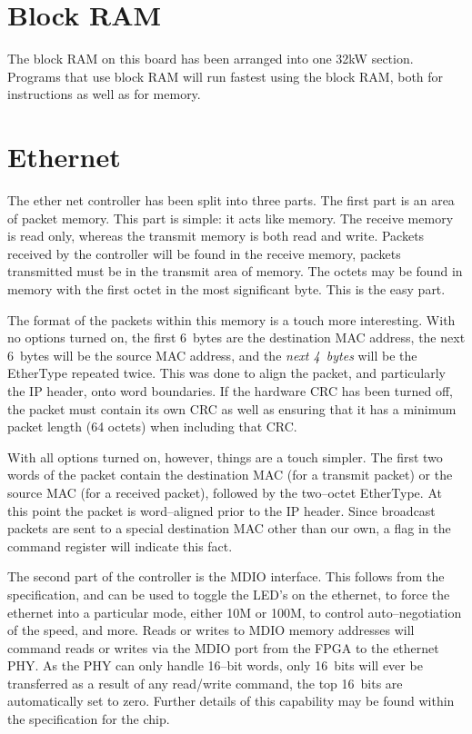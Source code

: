 \documentclass{gqtekspec}
\begin{document}
\section{Block RAM}

The block RAM on this board has been arranged into one 32kW section.
Programs that use block RAM will run fastest using the block RAM, both for
instructions as well as for memory.  

\section{Ethernet}

The ether net controller has been split into three parts.  The first part is
an area of packet memory.  This part is simple: it acts like memory.  The
receive memory is read only, whereas the transmit memory is both read and
write.  Packets received by the controller will be found in the receive memory,
packets transmitted must be in the transmit area of memory.  The octets
may be found in memory with the first octet in the most significant byte.
This is the easy part.

The format of the packets within this memory is a touch more interesting.
With no options turned on, the first 6~bytes are the destination MAC
address, the next 6~bytes will be the source MAC address, and the {\em next
4~bytes} will be the EtherType repeated twice.  This was done to align the
packet, and particularly the IP header, onto word boundaries.  If the hardware
CRC has been turned off, the packet must contain its own CRC as well as
ensuring that it has a minimum packet length (64 octets) when including that
CRC.

With all options turned on, however, things are a touch simpler.  The first
two words of the packet contain the destination MAC (for a transmit packet)
or the source MAC (for a received packet), followed by the two--octet
EtherType.  At this point the packet is word--aligned prior to the IP header.
Since broadcast packets are sent to a special destination MAC other than
our own, a flag in the command register will indicate this fact.


The second part of the controller is the MDIO interface.  This follows from
the specification, and can be used to toggle the LED's on the ethernet,
to force the ethernet into a particular mode, either 10M or 100M, to control
auto--negotiation of the speed, and more.  Reads or writes to MDIO memory
addresses will command reads or writes via the MDIO port from the FPGA to the
ethernet PHY.  As the PHY can only handle 16--bit words, only 16~bits will
ever be transferred as a result of any read/write command, the top 16~bits
are automatically set to zero.  Further details of this capability may be
found within the specification for the chip.
\end{document}

